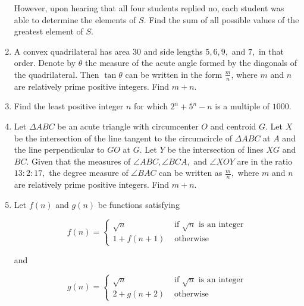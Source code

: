 \documentclass{article}
\begin{document}
\begin{enumerate}[label=\arabic*., itemsep=0.5em]
However, upon hearing that all four students replied no, each student was able to determine the elements of $S$. Find the sum of all possible values of the greatest element of $S$.\par \vspace{0.5em}\item A convex quadrilateral has area $30$ and side lengths $5, 6, 9,$ and $7,$ in that order. Denote by $\theta$ the measure of the acute angle formed by the diagonals of the quadrilateral. Then $\tan \theta$ can be written in the form $\tfrac{m}{n}$, where $m$ and $n$ are relatively prime positive integers. Find $m + n$.\par \vspace{0.5em}\item Find the least positive integer $n$ for which $2^n + 5^n - n$ is a multiple of $1000$.\par \vspace{0.5em}\item Let $\Delta ABC$ be an acute triangle with circumcenter $O$ and centroid $G$. Let $X$ be the intersection of the line tangent to the circumcircle of $\Delta ABC$ at $A$ and the line perpendicular to $GO$ at $G$. Let $Y$ be the intersection of lines $XG$ and $BC$. Given that the measures of $\angle ABC, \angle BCA, $ and $\angle XOY$ are in the ratio $13 : 2 : 17, $ the degree measure of $\angle BAC$ can be written as $\frac{m}{n},$ where $m$ and $n$ are relatively prime positive integers. Find $m+n$.\par \vspace{0.5em}\item Let $f(n)$ and $g(n)$ be functions satisfying

\begin{equation*}
f(n) = 
\begin{cases}
\sqrt{n} & \text{ if } \sqrt{n} \text{ is an integer}\\
1 + f(n+1) & \text{ otherwise}
\end{cases}
\end{equation*}

and

\begin{equation*}
g(n) = \begin{cases}\sqrt{n} & \text{ if } \sqrt{n} \text{ is an integer}\\
2 + g(n+2) & \text{ otherwise}
\end{cases}
\end{equation*}


\end{enumerate}
\end{document}
